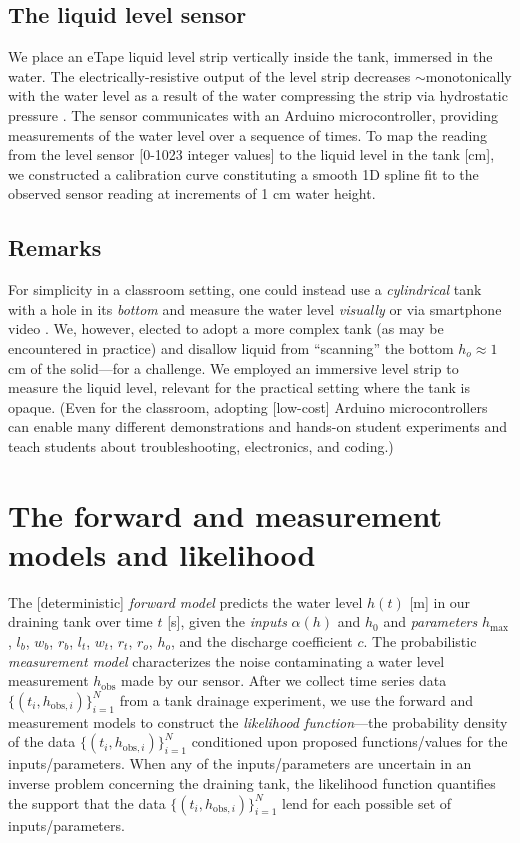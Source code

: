 \documentclass[a4paper,fleqn]{cas-dc}
\newcommand\thedata {$\{(t_i,h_{\text{obs}, i})\}_{i=1}^{N}$\xspace}
\begin{document}
\subsection{The liquid level sensor}
We place an eTape\texttrademark\xspace liquid level strip vertically inside the tank, immersed in the water. 
The electrically-resistive output of the level strip decreases $\sim$monotonically with the water level as a result of the water compressing the strip via hydrostatic pressure \cite{eTape}.
The sensor communicates with an Arduino microcontroller, providing measurements of the water level over a sequence of times. 
To map the reading from the level sensor [0-1023 integer values] to the liquid level in the tank [cm], we constructed a calibration curve constituting a smooth 1D spline fit to the observed sensor reading at increments of 1 cm water height.

\subsection{Remarks}
For simplicity in a classroom setting, one could instead use a \emph{cylindrical} tank with a hole in its \emph{bottom} and measure the water level \emph{visually} or via smartphone video \cite{brown2009innovative,klein2015video}. We, however, elected to adopt a more complex tank (as may be encountered in practice) and disallow liquid from ``scanning'' the bottom $h_o \approx 1$\,cm of the solid---for a challenge. We employed an immersive level strip to measure the liquid level, relevant for the practical setting where the tank is opaque. (Even for the classroom, adopting [low-cost] Arduino microcontrollers can enable many different demonstrations and hands-on student experiments \cite{kubinova2015chemduino,kang2019applying,Pino2018} and teach students about troubleshooting, electronics, and coding.) 


\section{The forward and measurement models and likelihood}
The [deterministic] \emph{forward model} predicts the water level $h(t)$ [m] in our draining tank over time $t$ [s], given the \emph{inputs} $\alpha(h)$ and $h_0$ and \emph{parameters} $h_{\text{max}}$, $l_b$, $w_b$, $r_b$, $l_t$, $w_t$, $r_t$, $r_o$, $h_o$, and the discharge coefficient $c$. 
The probabilistic \emph{measurement model} characterizes the noise contaminating a water level measurement $h_{\text{obs}}$ made by our sensor.
After we collect time series data \thedata from a tank drainage experiment, we use the forward and measurement models to construct the \emph{likelihood function}---the probability density of the data \thedata conditioned upon proposed functions/values for the inputs/parameters. 
When any of the inputs/parameters are uncertain in an inverse problem concerning the draining tank, the likelihood function quantifies the support that the data \thedata lend for each possible set of inputs/parameters.
\end{document}
